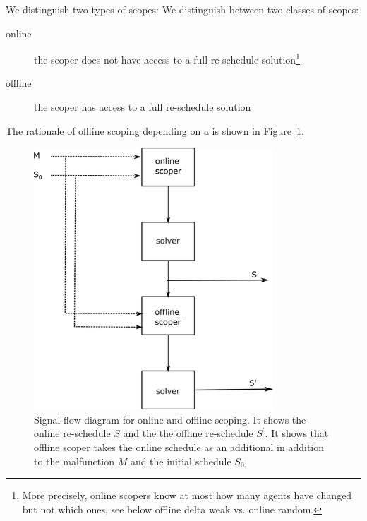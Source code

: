 \documentclass{article}
\begin{document}
We distinguish two types of scopes:
We distinguish between two classes of scopes:
\begin{description}
\item[online] the scoper does not have access to a full re-schedule solution\footnote{More precisely, online scopers know at most how many agents have changed but not which ones, see below offline delta weak vs. online random.}
\item[offline] the scoper has access to a full re-schedule solution
\end{description}
%
The rationale of offline scoping depending on a is shown in Figure~\ref{fig:online_offline}.
\begin{figure}[hbtp]
	\centering
  \includegraphics[width=0.8\textwidth]{Figures/02_research_approach/online_offline.pdf}
	\caption{Signal-flow diagram for online and offline scoping. It shows the online re-schedule $S$ and the the offline re-schedule $S^\prime$. It shows that offline scoper takes the online schedule as an additional in addition to the malfunction $M$ and the initial schedule $S_0$.}
	\label{fig:online_offline}
\end{figure}
\end{document}

